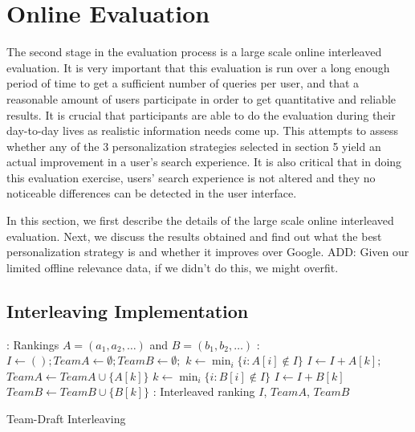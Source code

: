 \documentclass{sig-alternate}
\begin{document}
\section{Online Evaluation}

The second stage in the evaluation process is a large scale online interleaved evaluation. It is very important that this evaluation is run over a long enough period of time to get a sufficient number of queries per user, and that a reasonable amount of users participate in order to get quantitative and reliable results. It is crucial that participants are able to do the evaluation during their day-to-day lives as realistic information needs come up. This attempts to assess whether any of the 3 personalization strategies selected in section 5 yield an actual improvement in a user's search experience. It is also critical that in doing this evaluation exercise, users' search experience is not altered and they no noticeable differences can be detected in the user interface.

In this section, we first describe the details of the large scale online interleaved evaluation. Next, we discuss the results obtained and find out what the best personalization strategy is and whether it improves over Google. ADD: Given our limited offline relevance data, if we didn't do this, we might overfit.

\subsection{Interleaving Implementation}

\renewcommand{\algorithmiccomment}[1]{\dotfill {\it \small #1}}
\begin{algorithm}[t]
\begin{algorithmic}[1]
: Rankings $A = ( a_1, a_2, \dots)$ and $B = ( b_1, b_2,
\dots)$
: $I \leftarrow (); TeamA \leftarrow \emptyset; TeamB
\leftarrow \emptyset;$
    \STATE $k \leftarrow \min_i\{ i : A[i] \not\in I \}$
    \STATE $I \leftarrow I+A[k];$
    \STATE $TeamA \leftarrow TeamA \cup \{A[k]\}$
  \ELSE
    \STATE $k \leftarrow \min_i\{ i : B[i] \not\in I \}$
    \STATE $I \leftarrow I+B[k]$
    \STATE $TeamB \leftarrow TeamB \cup \{B[k]\}$
  \ENDIF
\ENDWHILE
{}: Interleaved ranking $I$, $TeamA$, $TeamB$
\end{algorithmic}
\caption{Team-Draft Interleaving} \label{alg:teamdraft}
\end{algorithm}
\end{document}
